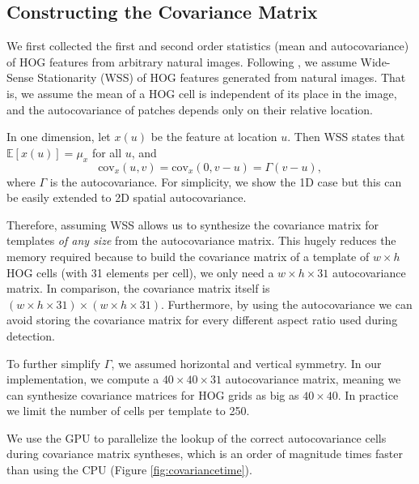 \documentclass[10pt,twocolumn,letterpaper]{article}
\begin{document}

\subsection{Constructing the Covariance Matrix}
\label{sec:feature_statistics}
We first collected the first and second order statistics (mean and
autocovariance) of HOG features from arbitrary natural images. Following
\cite{Hariharan12}, we assume Wide-Sense Stationarity (WSS) of HOG features
generated from natural images. That is, we assume the mean of a HOG cell is
independent of its place in the image, and the autocovariance of patches depends
only on their relative location.

In one dimension, let $x(u)$ be the feature at location $u$. Then WSS states
that $\mathbb{E}\left[x(u)\right] = \mu_x$ for all $u$, and
\begin{equation}
\textrm{cov}_x(u,v) = \textrm{cov}_x(0, v-u) = \Gamma(v-u),
\end{equation} where $\Gamma$ is the autocovariance. For simplicity, we show the 1D case but this can be easily extended to 2D spatial autocovariance.

Therefore, assuming WSS allows us to synthesize the covariance matrix for
templates \emph{of any size} from the autocovariance matrix. This hugely reduces
the memory required because to build the covariance matrix of a template of $w
\times h$ HOG cells (with 31 elements per cell), we only need a $w \times h
\times 31$ autocovariance matrix. In comparison, the covariance matrix itself is
$(w \times h \times 31) \times (w \times h \times 31)$. Furthermore, by using
the autocovariance we can avoid storing the covariance matrix for every
different aspect ratio used during detection.

To further simplify $\Gamma$, we assumed horizontal and vertical symmetry. In
our implementation, we compute a $40 \times 40 \times 31$ autocovariance matrix,
meaning we can synthesize covariance matrices for HOG grids as big as $40 \times
40$. In practice we limit the number of cells per template to 250.

We use the GPU to parallelize the lookup of the correct autocovariance cells
during covariance matrix syntheses, which is an order of magnitude times faster than using
the CPU (Figure \ref{fig:covariancetime}).
\end{document}
